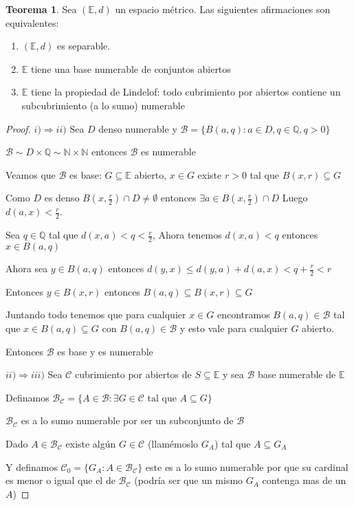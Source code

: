 \documentclass[12pt]{article}
\newcommand{\Q}{\mathbb{Q}}
\newcommand{\E}{\mathbb{E}}
\newcommand{\N}{\mathbb{N}}
\newcommand{\Ra}{\Rightarrow}
\theoremstyle{definition}
\newtheorem{theorem}{Teorema}
\begin{document}
\begin{theorem}
  Sea $(\E,d)$ un espacio métrico. Las siguientes afirmaciones son equivalentes:
  \begin{enumerate}
    \item $(\E,d)$ es separable.
    \item $\E$ tiene una base numerable de conjuntos abiertos
    \item $\E$ tiene la propiedad de Lindelof: todo cubrimiento por abiertos contiene un subcubrimiento (a lo sumo) numerable
  \end{enumerate}
  \begin{proof}
$i) \Ra ii)$ Sea $D$ denso numerable y $\mathcal{B} = \{B(a,q): a \in D, q \in \Q , q>0\}$

$\mathcal{B} \sim D \times \Q \sim \N \times \N$ entonces $\mathcal{B}$ es numerable

Veamos que $\mathcal{B}$ es base: $G \subseteq \E$ abierto, $x \in G$ existe $r>0$ tal que $B(x,r) \subseteq G$ 

Como $D$ es denso $B(x,\frac{r}{2}) \cap D \neq \emptyset$ entonces $\exists a \in B(x,\frac{r}{2}) \cap D$ Luego $d(a,x) < \frac{r}{2}$. 

Sea $q \in \Q$ tal que $d(x,a) < q < \frac{r}{2}$, Ahora tenemos $d(x,a) < q$ entonces $x \in B(a,q)$

Ahora sea $y \in B(a,q)$ entonces $d(y,x) \leq d(y,a) + d(a,x) < q + \frac{r}{2} < r$

Entonces $y \in B(x,r)$ entonces $B(a,q) \subseteq B(x,r) \subseteq G$

Juntando todo tenemos que para cualquier $x \in G$ encontramos $B(a,q) \in \mathcal{B}$ tal que $x \in B(a,q) \subseteq G$ con $B(a,q) \in \mathcal{B}$ y esto vale para cualquier $G$ abierto.

Entonces $\mathcal{B}$ es base y es numerable

$ii) \Ra iii)$ Sea $\mathcal{C}$ cubrimiento por abiertos de $S \subseteq \E$ y sea $\mathcal{B}$ base numerable de $\E$

Definamos $\mathcal{B}_{\mathcal{C}} = \{A \in \mathcal{B} : \exists G \in \mathcal{C} \text{ tal que } A \subseteq G\}$

$\mathcal{B}_{\mathcal{C}}$ es a lo sumo numerable por ser un subconjunto de $\mathcal{B}$

Dado $A \in \mathcal{B}_{\mathcal{C}}$ existe algún $G \in \mathcal{C}$ (llamémoslo $G_A$) tal que $A \subseteq G_{A}$

Y definamos $\mathcal{C}_0 = \{G_A : A \in \mathcal{B}_{\mathcal{C}}\}$ este es a lo sumo numerable por que su cardinal es menor o igual que el de $\mathcal{B}_{\mathcal{C}}$ (podría ser que un mismo $G_A$ contenga mas de un $A$)


\end{proof}
\end{theorem}
\end{document}
